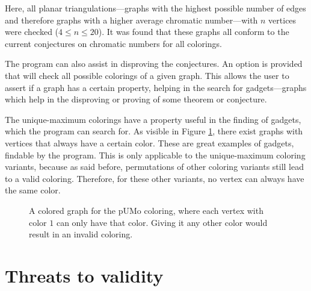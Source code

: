 \documentclass{article}
\begin{document}
Here, all planar triangulations---graphs with the highest possible number of edges and therefore graphs with a higher average chromatic number---with $n$ vertices were checked ($4 \le n \le 20$). It was found that these graphs all conform to the current conjectures on chromatic numbers for all colorings.

The program can also assist in disproving the conjectures. An option is provided that will check all possible colorings of a given graph. This allows the user to assert if a graph has a certain property, helping in the search for gadgets---graphs which help in the disproving or proving of some theorem or conjecture. 

The unique-maximum colorings have a property useful in the finding of gadgets, which the program can search for. As visible in Figure \ref{fig:graph}, there exist graphs with vertices that always have a certain color. These are great examples of gadgets, findable by the program. This is only applicable to the unique-maximum coloring variants, because as said before, permutations of other coloring variants still lead to a valid coloring. Therefore, for these other variants, no vertex can always have the same color.

\begin{figure}
	\begin{center}
	\end{center}
	\caption{A colored graph for the $\mathrm{pUMo}$ coloring, where each vertex with color $1$ can only have that color. Giving it any other color would result in an invalid coloring.}\label{fig:graph}
\end{figure}


\section{Threats to validity}
\label{sec:threats}
\end{document}
